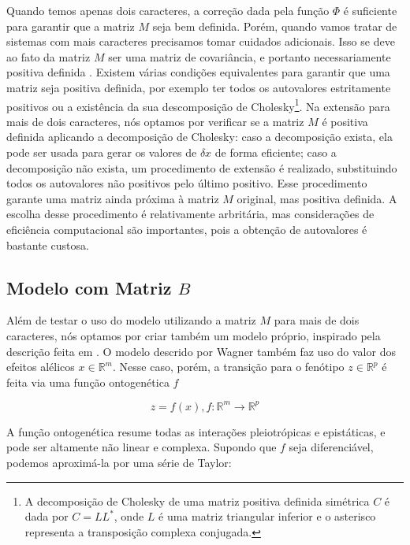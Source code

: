 Quando temos apenas dois caracteres, a correção dada pela função $\Phi$ é
suficiente para garantir que a matriz $M$ seja bem definida.
Porém, quando vamos tratar de sistemas com mais caracteres precisamos
tomar cuidados adicionais.
Isso se deve ao fato da matriz $M$ ser uma matriz de covariância, e
portanto necessariamente positiva definida \citep{Anderson1984}.
Existem várias condições equivalentes para garantir que uma matriz seja
positiva definida, por exemplo ter todos os autovalores estritamente
positivos ou a existência da sua descomposição de Cholesky\footnote{A
decomposição de Cholesky de uma matriz positiva definida simétrica
$C$ é dada por $C=LL^*$, onde $L$ é uma matriz triangular inferior e o asterisco
representa a transposição complexa conjugada.}.
Na extensão para mais de dois caracteres, nós optamos por verificar se a
matriz $M$ é positiva definida aplicando a decomposição de Cholesky:
caso a decomposição exista, ela pode ser usada para gerar os valores
de $\delta x$ de forma eficiente; caso a decomposição não exista, um
procedimento de extensão \citep{Marroig2011b} é realizado,
substituindo todos os autovalores não positivos pelo último positivo.
Esse procedimento garante uma matriz ainda próxima à matriz $M$
original, mas positiva definida.
A escolha desse procedimento é relativamente arbritária, mas
considerações de eficiência computacional são importantes, pois a
obtenção de autovalores é bastante custosa.

\subsection{Modelo com Matriz $B$}\label{cap2:mem:ModelB}

Além de testar o uso do modelo utilizando a matriz $M$ para mais de dois
caracteres, nós optamos por criar também um modelo próprio, inspirado pela
descrição feita em \cite{Wagner1984}.
O modelo descrido por Wagner também faz uso do valor dos efeitos
alélicos $x \in \mathbb{R}^m$.
Nesse caso, porém, a transição para o fenótipo $z \in \mathbb{R}^p$ é
feita via uma função ontogenética $f$

\begin{equation}
z = f(x), f:\mathbb{R}^m \rightarrow \mathbb{R}^{p}
\end{equation}

A função ontogenética resume todas as interações pleiotrópicas e
epistáticas, e pode ser altamente não linear e complexa.
Supondo que $f$ seja diferenciável, podemos aproximá-la por uma série de
Taylor:

